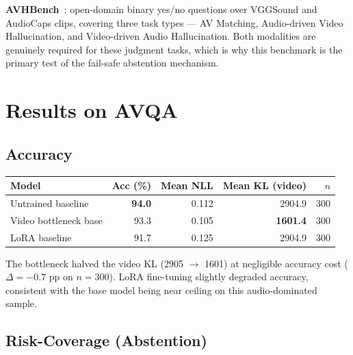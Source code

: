 \documentclass[11pt,a4paper]{article}
\begin{document}
\textbf{AVHBench}~\cite{avhbench2024}: open-domain binary yes/no questions
over VGGSound and AudioCaps clips, covering three task types --- AV Matching,
Audio-driven Video Hallucination, and Video-driven Audio Hallucination.
Both modalities are genuinely required for these judgment tasks, which is why
this benchmark is the primary test of the fail-safe abstention mechanism.

\section{Results on AVQA}

\subsection{Accuracy}

\begin{center}
\begin{tabular}{lrrrr}
\toprule
\textbf{Model} & \textbf{Acc (\%)} & \textbf{Mean NLL} & \textbf{Mean KL (video)} & $n$ \\
\midrule
Untrained baseline     & \textbf{94.0} & 0.112 & 2904.9 & 300 \\
Video bottleneck base  & 93.3          & 0.105 & \textbf{1601.4} & 300 \\
LoRA baseline          & 91.7          & 0.125 & 2904.9 & 300 \\
\bottomrule
\end{tabular}
\end{center}

The bottleneck halved the video KL (2905 $\to$ 1601) at negligible accuracy
cost ($\Delta{=}{-}0.7$ pp on $n{=}300$).  LoRA fine-tuning slightly degraded
accuracy, consistent with the base model being near ceiling on this
audio-dominated sample.

\subsection{Risk-Coverage (Abstention)}
\end{document}
